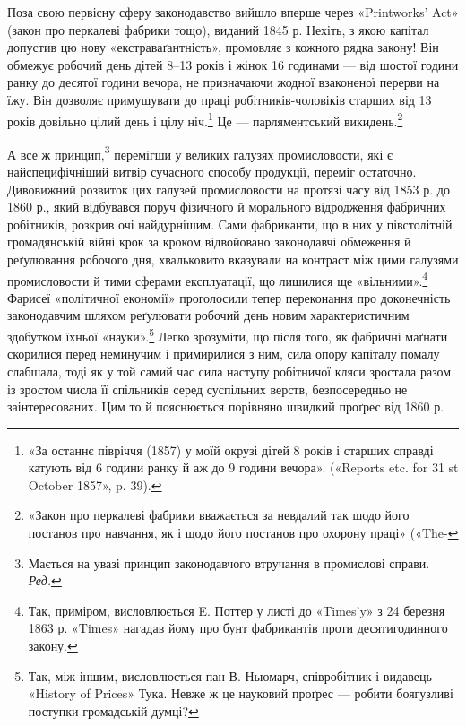 Поза свою первісну сферу законодавство вийшло вперше через
«Printworks’ Act» (закон про перкалеві фабрики тощо), виданий
1845 р. Нехіть, з якою капітал допустив цю нову «екстраваґантність»,
промовляє з кожного рядка закону! Він обмежує
робочий день дітей 8--13 років і жінок 16 годинами — від шостої
години ранку до десятої години вечора, не призначаючи жодної
взаконеної перерви на їжу. Він дозволяє примушувати до праці
робітників-чоловіків старших від 13 років довільно цілий
день і цілу ніч.\footnote{
«За останнє півріччя (1857) у моїй окрузі дітей 8 років і старших
справді катують від 6 години ранку й аж до 9 години вечора». («Reports
etc. for 31 st October 1857», p. 39).
} Це — парляментський викидень.\footnote{
«Закон про перкалеві фабрики вважається за невдалий так шодо його
постанов про навчання, як і щодо його постанов про охорону праці» («The-
}

А все ж принцип,\footnote*{
Мається на увазі принцип законодавчого втручання в промислові
справи. \emph{Ред.}
} перемігши у великих галузях промисловости,
які є найспецифічніший витвір сучасного способу продукції,
переміг остаточно. Дивовижний розвиток цих галузей промисловости
на протязі часу від 1853 р. до 1860 р., який відбувався
поруч фізичного й морального відродження фабричних робітників,
розкрив очі найдурнішим. Сами фабриканти, що в них у
півстолітній громадянській війні крок за кроком відвойовано
законодавчі обмеження й реґулювання робочого дня, хвальковито
вказували на контраст між цими галузями промисловости
й тими сферами експлуатації, що лишилися ще «вільними».\footnote{
Так, приміром, висловлюється E. Поттер у листі до «Times’y»
з 24 березня 1863 р. «Times» нагадав йому про бунт фабрикантів проти
десятигодинного закону.
}
Фарисеї «політичної економії» проголосили тепер переконання
про доконечність законодавчим шляхом реґулювати робочий день
новим характеристичним здобутком їхньої «науки».\footnote{
Так, між іншим, висловлюється пан В. Ньюмарч, співробітник
і видавець «History of Prices» Тука. Невже ж це науковий проґрес —
робити боягузливі поступки громадській думці?
} Легко
зрозуміти, що після того, як фабричні маґнати скорилися перед
неминучим і примирилися з ним, сила опору капіталу помалу
слабшала, тоді як у той самий час сила наступу робітничої кляси
зростала разом із зростом числа її спільників серед суспільних
верств, безпосередньо не заінтересованих. Цим то й пояснюється
порівняно швидкий проґрес від 1860 р.


